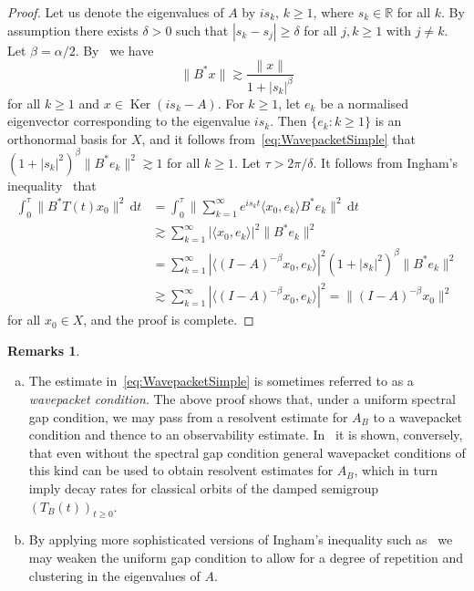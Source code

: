 \documentclass[11pt, a4paper]{amsart}
\DeclareMathOperator*{\Ker}{Ker}
\newcommand{\dd}{\mathrm{d}}
\newcommand{\RR}{\mathbb{R}}
\theoremstyle{definition}
\newtheorem{rems}[thm]{Remarks}
\numberwithin{equation}{section}
\begin{document}
\begin{proof}
Let us denote the eigenvalues of $A$ by $is_k$, $k\ge1$, where $s_k\in\RR$ for all $k$. By assumption there exists $\delta>0$ such that $|s_k-s_j|\ge\delta$ for all $j,k\ge1$ with $j\ne k$. Let $\beta=\alpha/2$. By~\cite[Prop.~5.1]{ChiPau23}  we have
\begin{equation}
\label{eq:WavepacketSimple}
\|B^\ast x\|\gtrsim \frac{\|x\|}{1+|s_k|^\beta} 
\end{equation}
for all $k\ge1$ and $x\in \Ker(is_k-A)$. For $k\ge1$, let $e_k$ be a normalised eigenvector corresponding to the eigenvalue $is_k$. Then $\{e_k:k\ge1\}$ is an orthonormal basis for $X$, and it follows from~\eqref{eq:WavepacketSimple} that  $(1+|s_k|^2)^\beta\|B^\ast e_k\|^2\gtrsim1$ for all $k\ge1$. Let $\tau>2\pi/\delta$. It follows from Ingham's inequality~\cite[Prop.~1.5.2]{AmmNic15book} that
$$\begin{aligned}
\int_0^\tau \|B^\ast T(t)x_0\|^2 \,\dd t&= \int_0^\tau \bigg\|\sum_{k=1}^\infty e^{is_kt}\langle x_0,e_k\rangle B^\ast e_k\bigg\|^2\, \dd t\\
&\gtrsim \sum_{k=1}^\infty |\langle x_0,e_k\rangle|^2 \|B^\ast e_k\|^2\\
&=\sum_{k=1}^\infty |\langle (I-A)^{-\beta}x_0,e_k\rangle|^2 (1+|s_k|^2)^\beta\|B^\ast e_k\|^2\\
&\gtrsim \sum_{k=1}^\infty |\langle (I-A)^{-\beta}x_0,e_k\rangle|^2=\|(I-A)^{-\beta}x_0\|^2
\end{aligned}
$$
for all $x_0\in X$, and the proof is complete.
\end{proof}

\begin{rems}
\begin{enumerate}[(a)]
\item The estimate in~\eqref{eq:WavepacketSimple} is sometimes referred to as a \emph{wave\-packet condition}. The above proof shows that, under a uniform spectral gap condition, we may pass from a resolvent estimate for $A_B$ to a wave\-packet condition and thence to an observability estimate. In~\cite[Sect.~3]{ChiPau23} it is shown, conversely, that even without the spectral gap condition general wavepacket conditions of this kind can be used to obtain resolvent estimates for $A_B$, which in turn imply decay rates for classical orbits of the damped semigroup  $(T_B(t))_{t\ge0}$.
\item By applying more sophisticated versions of Ingham's inequality such as~\cite[Cor.~1.5.4]{AmmNic15book} we may weaken the uniform gap condition to allow  for a degree of repetition and clustering in the  eigenvalues of $A$.
\end{enumerate}
\end{rems}
\end{document}
